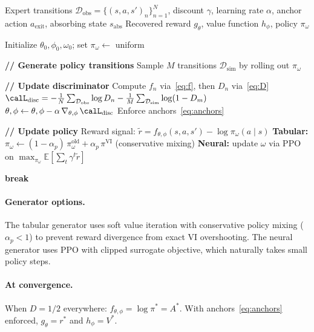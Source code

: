 \documentclass[11pt]{article}
\newcommand{\E}{\mathbb{E}}
\newcommand{\calD}{\mathcal{D}}
\begin{document}
\begin{algorithm}[h!]
\caption{AIRL with Anchor Constraints}
\label{alg:airl}
\begin{algorithmic}[1]
\REQUIRE Expert transitions $\calD_{\text{obs}} = \{(s, a, s')_n\}_{n=1}^N$, discount $\gamma$, learning rate $\alpha$, anchor action $a_{\text{exit}}$, absorbing state $s_{\text{abs}}$
\ENSURE Recovered reward $g_\theta$, value function $h_\phi$, policy $\pi_\omega$

\STATE Initialize $\theta_0, \phi_0, \omega_0$; set $\pi_\omega \leftarrow$ uniform


\STATE \textbf{// Generate policy transitions}
\STATE Sample $M$ transitions $\calD_{\text{sim}}$ by rolling out $\pi_\omega$

\STATE \textbf{// Update discriminator}
  \STATE Compute $f_n$ via~\eqref{eq:f}, then $D_n$ via~\eqref{eq:D}
  \STATE $\calL_{\text{disc}} = -\frac{1}{N}\sum_{\calD_{\text{obs}}} \log D_n - \frac{1}{M}\sum_{\calD_{\text{sim}}} \log(1 - D_m)$
  \STATE $\theta, \phi \leftarrow \theta, \phi - \alpha\,\nabla_{\theta,\phi}\,\calL_{\text{disc}}$
  \STATE Enforce anchors~\eqref{eq:anchors}
\ENDFOR

\STATE \textbf{// Update policy}
\STATE Reward signal: $\tilde{r} = f_{\theta,\phi}(s,a,s') - \log \pi_\omega(a \mid s)$
\STATE \textbf{Tabular:} $\pi_\omega \leftarrow (1-\alpha_p)\,\pi_\omega^{\text{old}} + \alpha_p\,\pi^{\text{VI}}$ \quad (conservative mixing)
\STATE \textbf{Neural:} update $\omega$ via PPO on $\max_{\pi_\omega} \E[\sum_t \gamma^t \tilde{r}]$

  \STATE \textbf{break}
\ENDIF

\ENDFOR
\end{algorithmic}
\end{algorithm}
\FloatBarrier

\paragraph{Generator options.} The tabular generator uses soft value iteration with conservative policy mixing ($\alpha_p < 1$) to prevent reward divergence from exact VI overshooting. The neural generator uses PPO with clipped surrogate objective, which naturally takes small policy steps.

\paragraph{At convergence.} When $D = 1/2$ everywhere: $f_{\theta,\phi} = \log \pi^* = A^*$. With anchors~\eqref{eq:anchors} enforced, $g_\theta = r^*$ and $h_\phi = V^*$.
\end{document}
